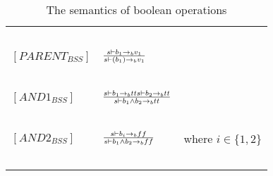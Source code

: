 \begin{table}[H]
\begin{tabular}{|l|l|l|}
			~			&															~																			& ~ \\
	$[PARENT_{BSS}]$	& $s \vdash b_{1} \rightarrow_{b} v_{1} \over s \vdash (b_{1}) \rightarrow_{b} v_{1}$													& ~ \\
			~			&															~																			& ~ \\
	$[AND1_{BSS}]$		& $s \vdash b_{1} \rightarrow_{b} tt  s \vdash b_{2} \rightarrow_{b} tt \over s \vdash b_{1} \wedge b_{2} \rightarrow_{b} tt$			& ~ \\
			~			&															~																			& ~ \\
	$[AND2_{BSS}]$		& $s \vdash b_{i} \rightarrow_{b} ff \over s \vdash b_{1} \wedge b_{2} \rightarrow_{b} ff$												& where $i \in \{1,2\}$ \\
			~			&															~																			& ~ \\
	\hline
	\end{tabular}
	\label{tab:semantics_boolean}
	\caption{The semantics of boolean operations}
\end{table}

